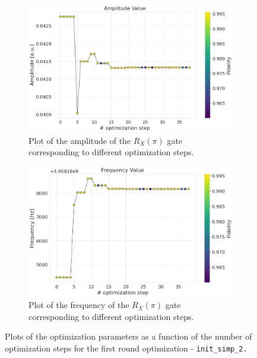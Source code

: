 \begin{figure}[h!]
    \centering
    \begin{subfigure}[t]{0.495\textwidth}
        \includegraphics[width=\textwidth]{figures/png/RB_optimization/NM/InitialSymplex/20241113_181711/Amplitude.png}
        \caption{Plot of the amplitude of the $R_X(\pi)$ gate corresponding to different optimization steps.}
        \label{fig:20241113_181711:amplitude}
    \end{subfigure}
    \hfill
    \begin{subfigure}[t]{0.495\textwidth}
        \includegraphics[width=\textwidth]{figures/png/RB_optimization/NM/InitialSymplex/20241113_181711/Frequency.png}
        \caption{Plot of the frequency of the $R_X(\pi)$ gate corresponding to different optimization steps.}
        \label{fig:20241113_181711:frequency}
    \end{subfigure}
    \caption{Plots of the optimization parameters as a function of the number of optimization steps for the first round optimization - \tt{init\_simp\_2}.}
    \label{fig:20241113_181711:parameters}
\end{figure}

